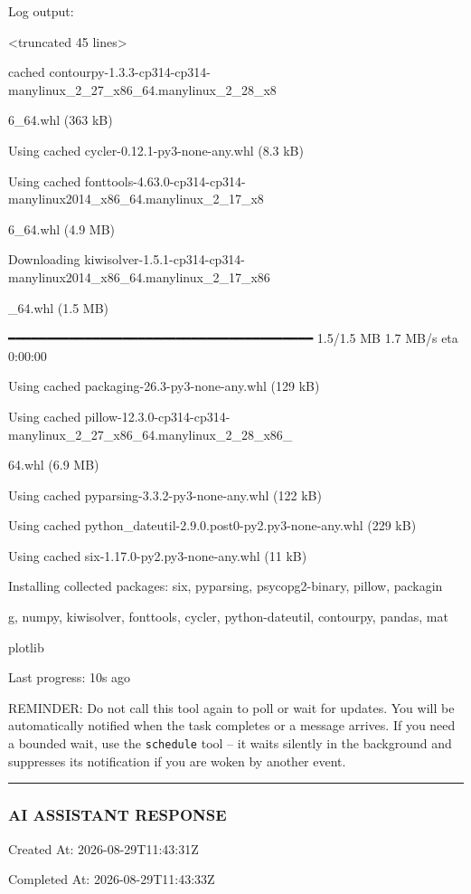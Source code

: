 \documentclass[11pt,a4paper]{article}
\begin{document}
Log output:

<truncated 45 lines>

cached contourpy-1.3.3-cp314-cp314-manylinux\_2\_27\_x86\_64.manylinux\_2\_28\_x8

6\_64.whl (363 kB)

Using cached cycler-0.12.1-py3-none-any.whl (8.3 kB)

Using cached fonttools-4.63.0-cp314-cp314-manylinux2014\_x86\_64.manylinux\_2\_17\_x8

6\_64.whl (4.9 MB)

Downloading kiwisolver-1.5.1-cp314-cp314-manylinux2014\_x86\_64.manylinux\_2\_17\_x86

\_64.whl (1.5 MB)

━━━━━━━━━━━━━━━━━━━━━━━━━━━━━━━━━━━━━━━━ 1.5/1.5 MB 1.7 MB/s eta 0:00:00

Using cached packaging-26.3-py3-none-any.whl (129 kB)

Using cached pillow-12.3.0-cp314-cp314-manylinux\_2\_27\_x86\_64.manylinux\_2\_28\_x86\_

64.whl (6.9 MB)

Using cached pyparsing-3.3.2-py3-none-any.whl (122 kB)

Using cached python\_dateutil-2.9.0.post0-py2.py3-none-any.whl (229 kB)

Using cached six-1.17.0-py2.py3-none-any.whl (11 kB)

Installing collected packages: six, pyparsing, psycopg2-binary, pillow, packagin

g, numpy, kiwisolver, fonttools, cycler, python-dateutil, contourpy, pandas, mat

plotlib


Last progress: 10s ago



REMINDER: Do not call this tool again to poll or wait for updates. You will be automatically notified when the task completes or a message arrives. If you need a bounded wait, use the \texttt{schedule} tool -- it waits silently in the background and suppresses its notification if you are woken by another event.


\hrule

\subsubsection{AI ASSISTANT RESPONSE}

Created At: 2026-08-29T11:43:31Z

Completed At: 2026-08-29T11:43:33Z
\end{document}
